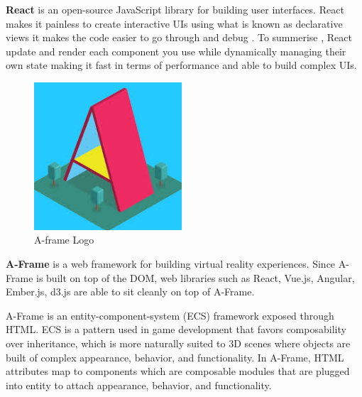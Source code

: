 \documentclass[]{report}
\begin{document}
\textbf{React} is an open-source JavaScript library for building user interfaces. React makes it painless to create interactive UIs using what is known as declarative views it makes the code easier to go through and debug . To summerise , React update and render each component you use while dynamically managing their own state making it fast in terms of performance and able to build complex UIs.\\ \par
\begin{figure}
	
	\includegraphics[width=5.5cm]{Aframe}
	\caption{A-frame Logo}
\end{figure}

\textbf{A-Frame} is a web framework for building virtual reality experiences. Since A-Frame is built on top of the DOM, web libraries such as React, Vue.js, Angular, Ember.js, d3.js are able to sit cleanly on top of A-Frame.

A-Frame is an entity-component-system (ECS) framework exposed through HTML. ECS is a pattern used in game development that favors composability over inheritance, which is more naturally suited to 3D scenes where objects are built of complex appearance, behavior, and functionality. In A-Frame, HTML attributes map to components which are composable modules that are plugged into entity to attach appearance, behavior, and functionality.
\\ \par 
\end{document}
